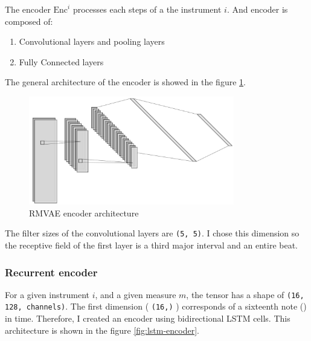 \documentclass[12pt]{report}
\begin{document}
The encoder $\text{Enc}^i$ processes each steps of a the instrument $i$. And encoder is composed of:
\begin{enumerate}
    \item Convolutional layers and pooling layers
    \item Fully Connected layers
\end{enumerate}
The general architecture of the encoder is showed in the figure \ref{fig:rmvae_encoder}.

\begin{figure}[htbp]
    \centering
    \includegraphics[width=0.8\textwidth]{images/nn/architectures/rmvae/encoder.jpg}
    \caption{RMVAE encoder architecture}
    \label{fig:rmvae_encoder}
\end{figure}

The filter sizes of the convolutional layers are \texttt{(5, 5)}.
I chose this dimension so the receptive field of the first layer is a third major interval and an entire beat.

\subsubsection{Recurrent encoder}
\label{sec:encoder:rnn}

For a given instrument $i$, and a given measure $m$, the tensor has a shape of \texttt{(16, 128, channels)}.
The first dimension ( \texttt{(16,)} ) corresponds of a sixteenth note (\musSixteenth) in time.
Therefore, I created an encoder using bidirectional LSTM cells.
This architecture is shown in the figure \ref{fig:lstm-encoder}.
\end{document}
